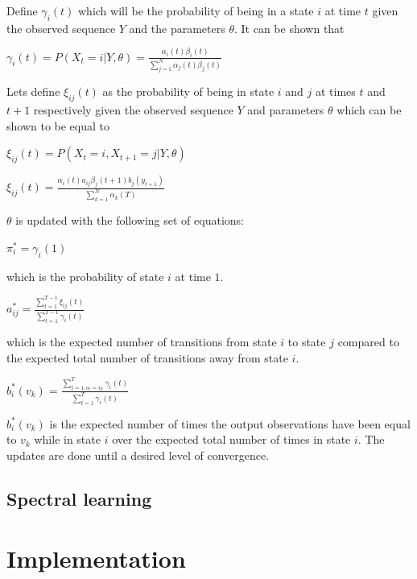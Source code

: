 \documentclass[letterpaper]{article}
\begin{document}
Define $\gamma_{i}(t)$ which will be the probability of being in a state $i$ at time $t$ given the observed sequence $Y$ and the parameters $\theta$. It can be shown that
\begin{center}
$
\gamma_{i}(t)=P(X_{t}=i|Y,\theta) = \frac{\alpha_{i}(t)\beta_{i}(t)}{\sum_{j=1}^N \alpha_{j}(t)\beta_{j}(t)}
$
\end{center}
Lets define $\xi_{ij}(t)$ as the probability of being in state $i$ and $j$ at times $t$ and $t+1$ respectively given the observed sequence $Y$ and parameters $\theta$ which can be shown to be equal to

\begin{center}

$\xi_{ij}(t)=P(X_{t}=i,X_{t+1}=j|Y,\theta)$

$\xi_{ij}(t)=\frac{\alpha_{i}(t) a_{ij} \beta_{j}(t+1) b_{j}(y_{t+1})}{\sum_{k=1}^N \alpha_k(T)}$
\end{center}

$\theta$ is updated with the following set of equations:

\begin{center}
$\pi_{i}^* = \gamma_{i}(1)$
\end{center}

which is the probability of state $i$ at time $1$.

\begin{center}
$a_{ij}^*=\frac{\sum^{T-1}_{t=1}\xi_{ij}(t)}{\sum^{T-1}_{t=1}\gamma_{i}(t)}$
\end{center}

which is the expected number of transitions from state $i$ to state $j$ compared to the expected total number of transitions away from state $i$.

\begin{center}
$b_{i}^*(v_{k})=\frac{\sum^T_{t=1,o_{t}=v_{k}} \gamma_{i}(t)}{\sum^T_{t=1} \gamma_i(t)}$
\end{center}

$b_{i}^*(v_{k})$ is the expected number of times the output observations have been equal to $v_{k}$ while in state $i$ over the expected total number of times in state $i$. The updates are done until a desired level of convergence.

\subsection{Spectral learning}

\section{Implementation}
\end{document}
